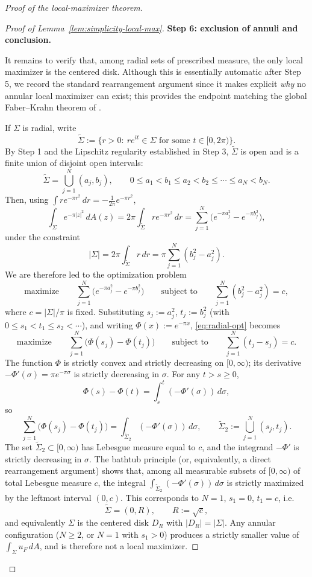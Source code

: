 \documentclass[a4paper,11pt,reqno]{amsart}
\numberwithin{equation}{section}
\theoremstyle{plain} %
\theoremstyle{definition} %
\theoremstyle{remark}
\begin{document}
\begin{proof}[Proof of the local-maximizer theorem]
\begin{proof}[Proof of Lemma~\ref{lem:simplicity-local-max}]
\medskip
\noindent
{\bf Step 6: exclusion of annuli and conclusion.}

It remains to verify that, among radial sets of prescribed measure, the only
local maximizer is the centered disk. Although this is essentially automatic
after Step 5, we record the standard rearrangement argument since it makes
explicit \emph{why} no annular local maximizer can exist; this provides the
endpoint matching the global Faber--Krahn theorem of \cite{Nicola-Tilli}.

If \(\Sigma\) is radial, write
\[
\widetilde \Sigma:=\{r>0:\ re^{it}\in \Sigma \text{ for some } t\in [0,2\pi)\}.
\]
By Step 1 and the Lipschitz regularity established in Step 3,
\(\widetilde \Sigma\) is open and is a finite union of disjoint open intervals:
\[
\widetilde \Sigma=\bigcup_{j=1}^N (a_j,b_j),
\qquad
0\le a_1<b_1\le a_2<b_2\le \cdots\le a_N<b_N.
\]
Then, using \(\int re^{-\pi r^2}\,dr=-\frac{1}{2\pi}e^{-\pi r^2}\),
\[
\int_\Sigma e^{-\pi |z|^2}\,dA(z)
=
2\pi \int_{\widetilde \Sigma} r e^{-\pi r^2}\,dr
=
\sum_{j=1}^N \big(e^{-\pi a_j^2}-e^{-\pi b_j^2}\big),
\]
under the constraint
\[
|\Sigma|
=
2\pi \int_{\widetilde \Sigma} r\,dr
=
\pi \sum_{j=1}^N (b_j^2-a_j^2).
\]
We are therefore led to the optimization problem
\begin{equation}\label{eq:radial-opt}
\text{maximize}\qquad
\sum_{j=1}^N \big(e^{-\pi a_j^2}-e^{-\pi b_j^2}\big)
\qquad \text{subject to}\qquad
\sum_{j=1}^N (b_j^2-a_j^2)=c,
\end{equation}
where \(c=|\Sigma|/\pi\) is fixed. Substituting \(s_j:=a_j^2\),
\(t_j:=b_j^2\) (with \(0\le s_1<t_1\le s_2<\cdots\)), and writing
\(\Phi(x):=e^{-\pi x}\), \eqref{eq:radial-opt} becomes
\[
\text{maximize}\qquad
\sum_{j=1}^N \big(\Phi(s_j)-\Phi(t_j)\big)
\qquad \text{subject to}\qquad
\sum_{j=1}^N (t_j-s_j)=c.
\]
The function \(\Phi\) is strictly convex and strictly decreasing on
\([0,\infty)\); its derivative \(-\Phi'(\sigma)=\pi e^{-\pi\sigma}\) is strictly
decreasing in \(\sigma\). For any \(t>s\ge 0\),
\[
\Phi(s)-\Phi(t)
=
\int_s^t (-\Phi'(\sigma))\,d\sigma,
\]
so
\[
\sum_{j=1}^N\big(\Phi(s_j)-\Phi(t_j)\big)
=
\int_{\widetilde\Sigma_2}(-\Phi'(\sigma))\,d\sigma,
\qquad
\widetilde\Sigma_2:=\bigcup_{j=1}^N (s_j,t_j).
\]
The set \(\widetilde\Sigma_2\subset[0,\infty)\) has Lebesgue measure equal to
\(c\), and the integrand \(-\Phi'\) is strictly decreasing in \(\sigma\). The
bathtub principle (or, equivalently, a direct rearrangement argument) shows
that, among all measurable subsets of \([0,\infty)\) of total Lebesgue measure
\(c\), the integral \(\int_{\widetilde\Sigma_2}(-\Phi'(\sigma))\,d\sigma\) is
strictly maximized by the leftmost interval \((0,c)\). This corresponds to
\(N=1\), \(s_1=0\), \(t_1=c\), i.e.
\[
\widetilde \Sigma=(0,R),
\qquad R:=\sqrt c,
\]
and equivalently \(\Sigma\) is the centered disk \(D_R\) with
\(|D_R|=|\Sigma|\). Any annular configuration (\(N\ge 2\), or \(N=1\) with
\(s_1>0\)) produces a strictly smaller value of \(\int_\Sigma u_F\,dA\), and is
therefore not a local maximizer.


\end{proof}
\end{proof}
\end{document}
